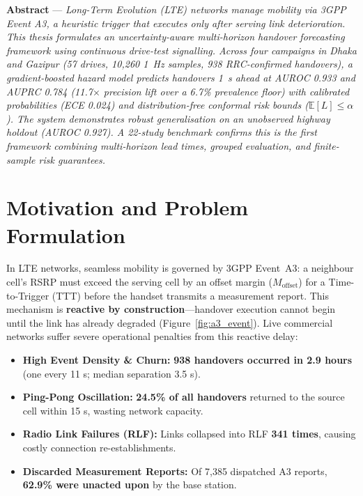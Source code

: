 \documentclass[10pt,a4paper]{article}
\begin{document}
\vspace{6pt}

\noindent\textbf{\color{NavyBlue}Abstract} --- \textit{Long-Term Evolution (LTE) networks manage mobility via 3GPP Event A3, a heuristic trigger that executes only after serving link deterioration. This thesis formulates an uncertainty-aware multi-horizon handover forecasting framework using continuous drive-test signalling. Across four campaigns in Dhaka and Gazipur (57 drives, 10,260 1~Hz samples, 938 RRC-confirmed handovers), a gradient-boosted hazard model predicts handovers 1~s ahead at AUROC 0.933 and AUPRC 0.784 (11.7$\times$ precision lift over a 6.7\% prevalence floor) with calibrated probabilities (ECE 0.024) and distribution-free conformal risk bounds ($\mathbb{E}[L] \le \alpha$). The system demonstrates robust generalisation on an unobserved highway holdout (AUROC 0.927). A 22-study benchmark confirms this is the first framework combining multi-horizon lead times, grouped evaluation, and finite-sample risk guarantees.}

\section{Motivation and Problem Formulation}

In LTE networks, seamless mobility is governed by 3GPP Event~A3: a neighbour cell's RSRP must exceed the serving cell by an offset margin ($M_{\text{offset}}$) for a Time-to-Trigger (TTT) before the handset transmits a measurement report. This mechanism is \textbf{reactive by construction}---handover execution cannot begin until the link has already degraded (Figure~\ref{fig:a3_event}). Live commercial networks suffer severe operational penalties from this reactive delay:
\begin{itemize}
    \item \textbf{High Event Density \& Churn:} \textbf{938 handovers occurred in 2.9 hours} (one every 11 s; median separation 3.5 s).
    \item \textbf{Ping-Pong Oscillation:} \textbf{24.5\% of all handovers} returned to the source cell within 15 s, wasting network capacity.
    \item \textbf{Radio Link Failures (RLF):} Links collapsed into RLF \textbf{341 times}, causing costly connection re-establishments.
    \item \textbf{Discarded Measurement Reports:} Of 7,385 dispatched A3 reports, \textbf{62.9\% were unacted upon} by the base station.
\end{itemize}
\end{document}
